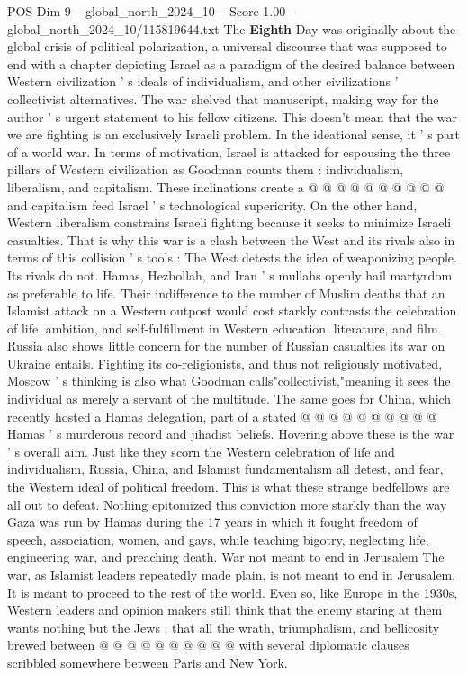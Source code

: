 \begin{textsample}{POS Dim 9 – global\_north\_2024\_10 – Score 1.00 – global\_north\_2024\_10/115819644.txt}
The \textbf{Eighth} Day was originally about the global crisis of political polarization, a universal discourse that was supposed to end with a chapter depicting Israel as a paradigm of the desired balance between Western civilization ' s ideals of individualism, and other civilizations ' collectivist alternatives.
The war shelved that manuscript, making way for the author ' s urgent statement to his fellow citizens.
This doesn't mean that the war we are fighting is an exclusively Israeli problem.
In the ideational sense, it ' s part of a world war.
In terms of motivation, Israel is attacked for espousing the three pillars of Western civilization as Goodman counts them : individualism, liberalism, and capitalism.
These inclinations create a @ @ @ @ @ @ @ @ @ @ and capitalism feed Israel ' s technological superiority.
On the other hand, Western liberalism constrains Israeli fighting because it seeks to minimize Israeli casualties.
That is why this war is a clash between the West and its rivals also in terms of this collision ' s tools : The West detests the idea of weaponizing people.
Its rivals do not.
Hamas, Hezbollah, and Iran ' s mullahs openly hail martyrdom as preferable to life.
Their indifference to the number of Muslim deaths that an Islamist attack on a Western outpost would cost starkly contrasts the celebration of life, ambition, and self-fulfillment in Western education, literature, and film.
Russia also shows little concern for the number of Russian casualties its war on Ukraine entails.
Fighting its co-religionists, and thus not religiously motivated, Moscow ' s thinking is also what Goodman calls"collectivist,"meaning it sees the individual as merely a servant of the multitude.
The same goes for China, which recently hosted a Hamas delegation, part of a stated @ @ @ @ @ @ @ @ @ @ Hamas ' s murderous record and jihadist beliefs.
Hovering above these is the war ' s overall aim.
Just like they scorn the Western celebration of life and individualism, Russia, China, and Islamist fundamentalism all detest, and fear, the Western ideal of political freedom.
This is what these strange bedfellows are all out to defeat.
Nothing epitomized this conviction more starkly than the way Gaza was run by Hamas during the 17 years in which it fought freedom of speech, association, women, and gays, while teaching bigotry, neglecting life, engineering war, and preaching death.
War not meant to end in Jerusalem The war, as Islamist leaders repeatedly made plain, is not meant to end in Jerusalem.
It is meant to proceed to the rest of the world.
Even so, like Europe in the 1930s, Western leaders and opinion makers still think that the enemy staring at them wants nothing but the Jews ; that all the wrath, triumphalism, and bellicosity brewed between @ @ @ @ @ @ @ @ @ @ with several diplomatic clauses scribbled somewhere between Paris and New York.

\end{textsample}
